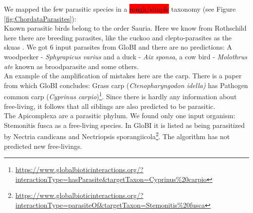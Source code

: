       We mapped the few parasitic species in a \colorbox{red}{rough/simple} taxonomy (see Figure \ref{fig:ChordataParasites}): \\
      Known parasitic birds belong to the order Sauria. Here we know from Rothschild  here there are 
        breeding parasites, like the cuckoo and clepto-parasites as the skuas \cite{Rothschild1957}. We
        got 6 input parasites from GloBI and there are no predictions: A woodpecker - 
        \textit{Sphyrapicus varius} and a duck - \textit{Aix sponsa}, a cow bird - \textit{Molothrus ate} 
        known as broodparasite and some others. \\
      An example of the amplification of mistakes here are the carp. There is a paper from which GloBI 
        concludes: Grass carp (\textit{Ctenopharyngodon idella)} has Pathogen common carp 
        (\textit{Cyprinus carpio})\footnote{
          \hyperlink{https://www.globalbioticinteractions.org/?interactionType=hasParasite&targetTaxon=Cyprinus\%20carpio}
          {https://www.globalbioticinteractions.org/?interactionType=hasParasite\&targetTaxon=Cyprinus\%20carpio}
        }. Since there is hardly any information about free-living, it follows that all siblings are 
        also predicted to be parasitic. \\

      The Apicomplexa are a parasitic phylum. We found only one input organism: Stemonitis fusca as a 
        free-living species. In GloBI it is listed as being parasitized by Nectria candicans and Nectriopsis 
        sporangiicola\footnote{
          \hyperlink{https://www.globalbioticinteractions.org/?interactionType=parasiteOf&targetTaxon=Stemonitis\%20fusca}
          {https://www.globalbioticinteractions.org/?interactionType=parasiteOf\&targetTaxon=Stemonitis\%20fusca}
        }. The algorithm has not predicted new free-livings. \\

